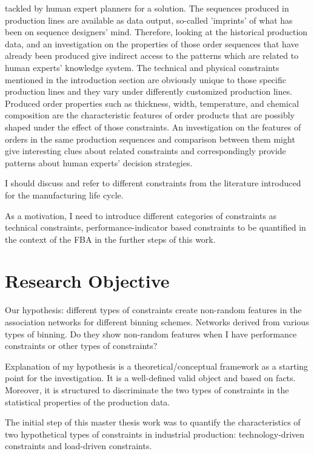 {tackled by human expert planners for a solution. The sequences produced in production lines are available as data output, so-called 'imprints' of what has been on sequence designers' mind. Therefore, looking at the historical production data, and an investigation on the properties of those order sequences that have already been produced give indirect access to the patterns which are related to human experts' knowledge system. The technical and physical constraints mentioned in the introduction section are obviously unique to those specific production lines and they vary under differently customized production lines. Produced order properties such as thickness, width, temperature, and chemical composition are the characteristic features of order products that are possibly shaped under the effect of those constraints. An investigation on the features of orders in the same production sequences and comparison between them might give interesting clues about related constraints and correspondingly provide patterns about human experts' decision strategies.
		
	I should discuss and refer to different constraints from the literature introduced for the manufacturing life cycle.
	
	As a motivation, I need to introduce different categories of constraints as technical constraints, performance-indicator based constraints to be quantified in the context of the FBA in the further steps of this work. 
}

\section{Research Objective}

{\color{red} 
	Our hypothesis: different types of constraints create non-random features in the association networks for different binning schemes. Networks derived from various types of binning. Do they show non-random features when I have performance constraints or other types of constraints?
	
	Explanation of my hypothesis is a theoretical/conceptual framework as a starting point for the investigation. It is a well-defined valid object and based on facts. Moreover, it is structured to discriminate the two types of constraints in the statistical properties of the production data.
	
	The initial step of this master thesis work was to quantify the characteristics of two hypothetical types of constraints in industrial production: technology-driven constraints and load-driven constraints. 
}

